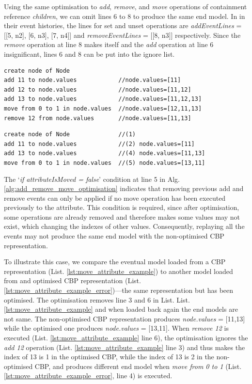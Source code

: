 \documentclass{llncs}
\begin{document}
Using the same optimisation to \emph{add}, \emph{remove}, and \emph{move} operations of containment reference \emph{children}, we can omit lines 6 to 8 to produce the same end model. In in their event histories, the lines for set and unset operations are \emph{addEventLines} = [[5, n2], [6, n3], [7, n4]] and \emph{removeEventLines} = [[8, n3]] respectively. Since the \emph{remove} operation at line 8 makes itself and the \emph{add} operation at line 6 insignificant, lines 6 and 8 can be put into the ignore list.

\begin{lstlisting}[style=eol,caption={Example of CBP representation of attribute \emph{values}'s move operations.},label=lst:move_attribute_example]
create node of Node
add 11 to node.values            //node.values=[11] 
add 12 to node.values            //node.values=[11,12] 
add 13 to node.values            //node.values=[11,12,13] 
move from 0 to 1 in node.values  //node.values=[12,11,13]  
remove 12 from node.values       //node.values=[11,13] 
\end{lstlisting}

\begin{lstlisting}[style=eol,caption={Example of optimised CBP representation of attribute \emph{values}'s move operations.},label=lst:move_attribute_example_error]
create node of Node              //(1)  
add 11 to node.values            //(2) node.values=[11] 
add 13 to node.values            //(4) node.values=[11,13] 
move from 0 to 1 in node.values  //(5) node.values=[13,11]   
\end{lstlisting}

The `\emph{if attributeIsMoved = false}' condition at line 5 in Alg. \ref{alg:add_remove_move_optimisation} indicates that removing previous add and remove events can only be applied if no move operation has been executed previously to the attribute. This condition is required, since after optimisation, some operations are already removed and therefore makes some values may not exist, which changing the indexes of other values. Consequently, replaying all the events may not produce the same end model with the non-optimised CBP representation. 

To illustrate this case, we compare the eventual model loaded from a CBP representation (List. \ref{lst:move_attribute_example}) to another model loaded from and optimised CBP representation (List. \ref{lst:move_attribute_example_error})---the same representation but has been optimised. The optimisation removes line 3 and 6 in List. List. \ref{lst:move_attribute_example} and when loaded back again the end models are not same. The non-optimised CBP representation produces \emph{node.values} = [11,13] while the optimised one produces \emph{node.values} = [13,11]. When \emph{remove 12} is executed (List. \ref{lst:move_attribute_example} line 6), the optimisation ignores the \emph{add 12} operation (List. \ref{lst:move_attribute_example} line 3) and thus makes the index of 13 is 1 in the optimised CBP, while the index of 13 is 2 in the non-optimised CBP, and produces different end model when \emph{move from 0 to 1} (List. \ref{lst:move_attribute_example_error}, line 4) is executed. 
\end{document}
